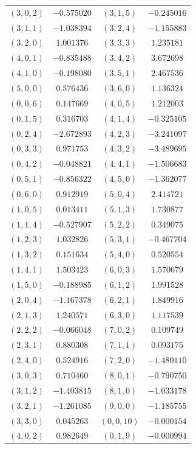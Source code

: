 \begin{table}
\begin{tabular}{cc@{\qquad}cc}
$(3,0,2)$ & $-0.575020$ & $(3,1,5)$ & $-0.245016$ \\
$(3,1,1)$ & $-1.038394$ & $(3,2,4)$ & $-1.155883$ \\
$(3,2,0)$ & $1.001376$ & $(3,3,3)$ & $1.235181$ \\
$(4,0,1)$ & $-0.835488$ & $(3,4,2)$ & $3.672698$ \\
$(4,1,0)$ & $-0.198080$ & $(3,5,1)$ & $2.467536$ \\
$(5,0,0)$ & $0.576436$ & $(3,6,0)$ & $1.136324$ \\
$(0,0,6)$ & $0.147669$ & $(4,0,5)$ & $1.212003$ \\
$(0,1,5)$ & $0.316703$ & $(4,1,4)$ & $-0.325105$ \\
$(0,2,4)$ & $-2.672893$ & $(4,2,3)$ & $-3.241097$ \\
$(0,3,3)$ & $0.971753$ & $(4,3,2)$ & $-3.489695$ \\
$(0,4,2)$ & $-0.048821$ & $(4,4,1)$ & $-1.506683$ \\
$(0,5,1)$ & $-0.856322$ & $(4,5,0)$ & $-1.362077$ \\
$(0,6,0)$ & $0.912919$ & $(5,0,4)$ & $2.414721$ \\
$(1,0,5)$ & $0.013411$ & $(5,1,3)$ & $1.730877$ \\
$(1,1,4)$ & $-0.527907$ & $(5,2,2)$ & $0.349075$ \\
$(1,2,3)$ & $1.032826$ & $(5,3,1)$ & $-0.467704$ \\
$(1,3,2)$ & $0.151634$ & $(5,4,0)$ & $0.520554$ \\
$(1,4,1)$ & $1.503423$ & $(6,0,3)$ & $1.570679$ \\
$(1,5,0)$ & $-0.188985$ & $(6,1,2)$ & $1.991528$ \\
$(2,0,4)$ & $-1.167378$ & $(6,2,1)$ & $1.849916$ \\
$(2,1,3)$ & $1.240571$ & $(6,3,0)$ & $1.117539$ \\
$(2,2,2)$ & $-0.066048$ & $(7,0,2)$ & $0.109749$ \\
$(2,3,1)$ & $0.880308$ & $(7,1,1)$ & $0.093175$ \\
$(2,4,0)$ & $0.524916$ & $(7,2,0)$ & $-1.480110$ \\
$(3,0,3)$ & $0.710460$ & $(8,0,1)$ & $-0.790750$ \\
$(3,1,2)$ & $-1.403815$ & $(8,1,0)$ & $-1.033178$ \\
$(3,2,1)$ & $-1.261085$ & $(9,0,0)$ & $-1.185755$ \\
$(3,3,0)$ & $0.045263$ & $(0,0,10)$ & $-0.000154$ \\
$(4,0,2)$ & $0.982649$ & $(0,1,9)$ & $-0.000994$ \\

\end{tabular}
\end{table}
